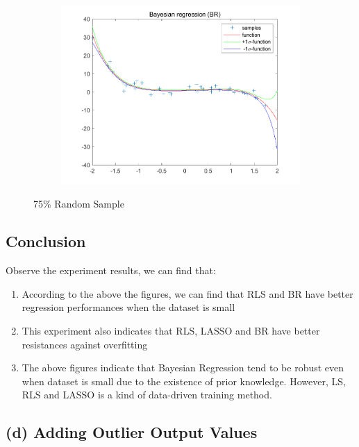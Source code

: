 \documentclass{article}
\begin{document}
\begin{figure}[H]
\begin{subfigure}[b]{0.475\textwidth}
        \includegraphics[width=\textwidth]{fig/1c-75-br.png} 
    \end{subfigure}
    \caption{75\% Random Sample}
\end{figure}

\subsection*{Conclusion}
Observe the experiment results, we can find that:

\begin{enumerate}[label=(\roman*)]
    \item According to the above the figures, we can find that RLS and BR have better regression performances when the dataset is small
    \item This experiment also indicates that RLS, LASSO and BR have better resistances against overfitting
    \item The above figures indicate that Bayesian Regression tend to be robust even when dataset is small due to the existence of prior knowledge. However, LS, RLS and LASSO is a kind of data-driven training method.
\end{enumerate}

\subsection*{(d) Adding Outlier Output Values}
\end{document}
